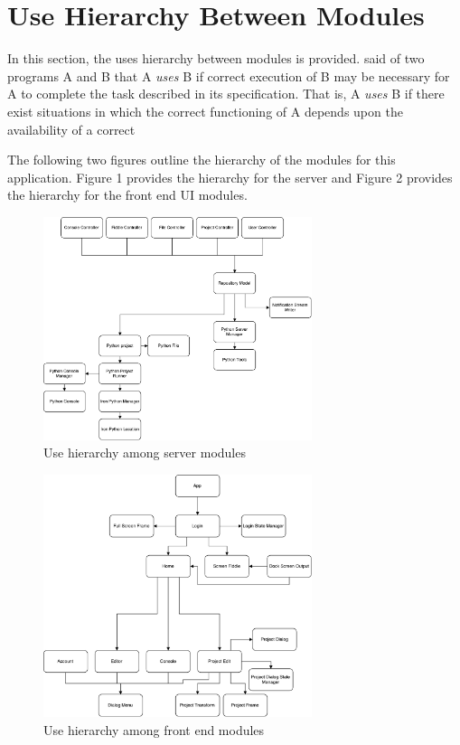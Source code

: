 \documentclass[12pt, titlepage]{article}
\begin{document}
\section{Use Hierarchy Between Modules} \label{SecUse}

In this section, the uses hierarchy between modules is
provided. \citet{Parnas1978} said of two programs A and B that A {\em uses} B if
correct execution of B may be necessary for A to complete the task described in
its specification. That is, A {\em uses} B if there exist situations in which
the correct functioning of A depends upon the availability of a correct

The following two figures outline the hierarchy of the modules for this
application.  Figure 1 provides the hierarchy for the server and Figure 2
provides the hierarchy for the front end UI modules.

\begin{figure}[H]
\centering
\includegraphics[width=0.7\textwidth]{__diagrams/uses-server.pdf}
\caption{Use hierarchy among server modules}
\label{FigUH}
\end{figure}

\begin{figure}[H]
\centering
\includegraphics[width=0.7\textwidth]{__diagrams/uses-frontend.pdf}
\caption{Use hierarchy among front end modules}
\label{FigUH}
\end{figure}
\end{document}
